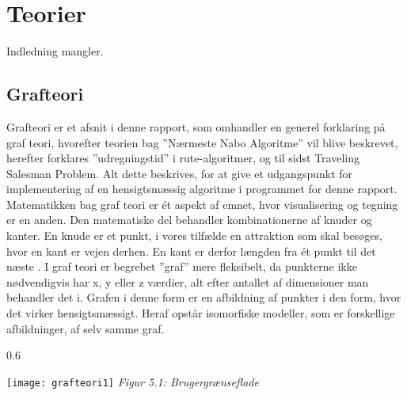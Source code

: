 \section{Teorier}
Indledning mangler.

\subsection{Grafteori}
Grafteori er et afsnit i denne rapport, som omhandler en generel forklaring på graf teori, hvorefter teorien bag ”Nærmeste Nabo Algoritme” vil blive beskrevet, herefter forklares ”udregningstid” i rute-algoritmer, og til sidst Traveling Salesman Problem. Alt dette beskrives, for at give et udgangspunkt for implementering af en hensigtsmæssig algoritme i programmet for denne rapport.\newline
Matematikken bag graf teori er ét aspekt af emnet, hvor visualisering og tegning er en anden. Den matematiske del behandler kombinationerne af knuder og kanter. En knude er et punkt, i vores tilfælde en attraktion som skal besøges, hvor en kant er vejen derhen. En kant er derfor længden fra ét punkt til det næste \citep{GraphTheory}.
I graf teori er begrebet ”graf” mere fleksibelt, da punkterne ikke nødvendigvis har x, y eller z værdier, alt efter antallet af dimensioner man behandler det i. Grafen i denne form er en afbildning af punkter i den form, hvor det virker hensigtsmæssigt. Heraf opstår isomorfiske modeller, som er forskellige afbildninger, af selv samme graf. 

\begin{wrapfigure}{}{0.6\textwidth}
  \vspace{-20pt}
  \begin{center}
    \texttt{[image: grafteori1]} \newline
    \textit{Figur 5.1: Brugergrænseflade}\newline
  \end{center}
  \vspace{-20pt}
  \vspace{-20pt}
\end{wrapfigure}


